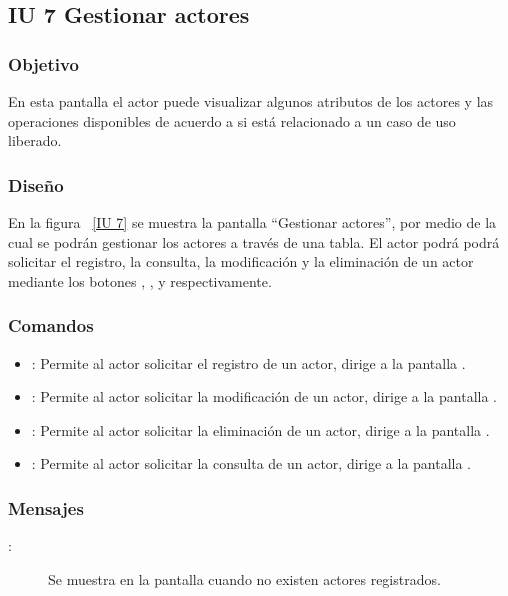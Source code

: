 \newpage 
\subsection{IU 7 Gestionar actores}
\subsubsection{Objetivo}
	
	En esta pantalla el actor puede visualizar algunos atributos de los actores y las operaciones disponibles de acuerdo a si está relacionado a un caso de uso liberado.

\subsubsection{Diseño}

    En la figura ~\ref{IU 7} se muestra la pantalla ``Gestionar actores'', por medio de la cual 
    se podrán gestionar los actores a través de una tabla.
    El actor podrá podrá solicitar el registro, la consulta, la modificación y la eliminación de un actor mediante los botones
    , \btnConsulta, \btnEditar y \btnEliminar respectivamente. \\



\subsubsection{Comandos}
\begin{itemize}
	\item {}: Permite al actor solicitar el registro de un actor, dirige a la pantalla .
	\item \btnEditar[Modificar]: Permite al actor solicitar la modificación de un actor, dirige a la pantalla .
	\item \btnEliminar[Eliminar]: Permite al actor solicitar la eliminación de un actor, dirige a la pantalla .
	\item \btnConsulta[Consultar]: Permite al actor solicitar la consulta de un actor, dirige a la pantalla .
\end{itemize}

\subsubsection{Mensajes}

	
\begin{description}
	\item[:] Se muestra en la pantalla  cuando no existen actores registrados.
\end{description}
